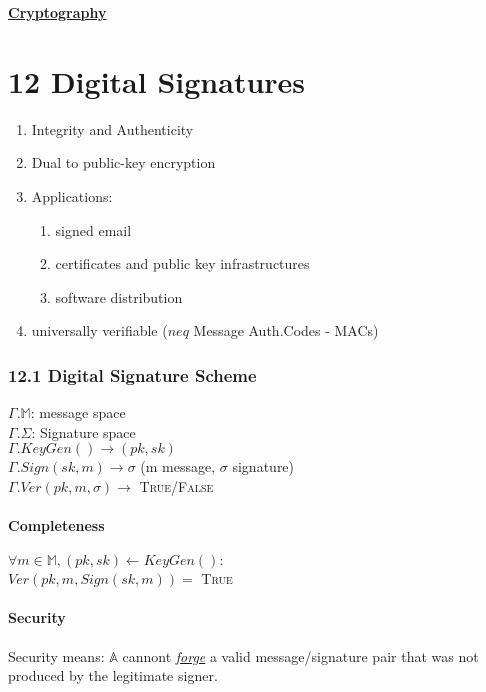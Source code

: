 \documentclass{report}
\begin{document}
\begin{center}
\huge{\textbf{\underline{Cryptography}}}
\end{center}

	{\let\clearpage\relax \chapter*{12 Digital Signatures}}
	
	\begin{enumerate}[-]
		\item Integrity and Authenticity 
		\item Dual to public-key encryption
		\item Applications:
		\begin{enumerate}[-]
			\item signed email
			\item certificates and public key infrastructures
			\item software distribution
		\end{enumerate}
		\item universally verifiable ($neq$ Message Auth.Codes - MACs)
	\end{enumerate}
	
	\subsection*{12.1 Digital Signature Scheme}
	$\Gamma.\mathbb{M}$: message space \\
	$\Gamma.\Sigma$: Signature space \\
	$\Gamma.KeyGen() \rightarrow (pk, sk)$ \\
	$\Gamma.Sign(sk, m) \rightarrow \sigma$ (m message, $\sigma$ signature) \\
	$\Gamma.Ver(pk,m,\sigma) \rightarrow$ \textsc{True/False}
	\subsubsection*{Completeness}
	$\forall m \in \mathbb{M}, (pk,sk) \leftarrow KeyGen():$ \\
	$Ver(pk,m,Sign(sk,m)) =$ \textsc{True}
	\subsubsection*{Security}
	Security means: $\mathbb{A}$ cannont \underline{\textit{forge}} a valid message/signature pair that was not produced by the legitimate signer.
\end{document}
